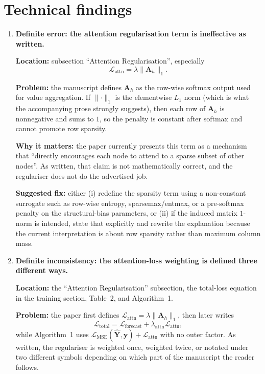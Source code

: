 \documentclass[11pt]{article}
\begin{document}
\section*{Technical findings}

\begin{enumerate}

\item \textbf{Definite error: the attention regularisation term is ineffective as written.}

\textbf{Location:} subsection ``Attention Regularisation'', especially
\[
\mathcal{L}_{\text{attn}} = \lambda \lVert \mathbf{A}_h \rVert_1.
\]

\textbf{Problem:} the manuscript defines $\mathbf{A}_h$ as the row-wise softmax output used for value aggregation. If $\lVert \cdot \rVert_1$ is the elementwise $L_1$ norm (which is what the accompanying prose strongly suggests), then each row of $\mathbf{A}_h$ is nonnegative and sums to $1$, so the penalty is constant after softmax and cannot promote row sparsity.

\textbf{Why it matters:} the paper currently presents this term as a mechanism that ``directly encourages each node to attend to a sparse subset of other nodes''. As written, that claim is not mathematically correct, and the regulariser does not do the advertised job.

\textbf{Suggested fix:} either (i) redefine the sparsity term using a non-constant surrogate such as row-wise entropy, sparsemax/entmax, or a pre-softmax penalty on the structural-bias parameters, or (ii) if the induced matrix $1$-norm is intended, state that explicitly and rewrite the explanation because the current interpretation is about row sparsity rather than maximum column mass.

\item \textbf{Definite inconsistency: the attention-loss weighting is defined three different ways.}

\textbf{Location:} the ``Attention Regularisation'' subsection, the total-loss equation in the training section, Table~2, and Algorithm~1.

\textbf{Problem:} the paper first defines $\mathcal{L}_{\text{attn}} = \lambda \lVert \mathbf{A}_h \rVert_1$, then later writes
\[
\mathcal{L}_{\text{total}} = \mathcal{L}_{\text{forecast}} + \lambda_{\text{attn}}\mathcal{L}_{\text{attn}},
\]
while Algorithm~1 uses $\mathcal{L}_{\text{MSE}}(\hat{\mathbf{Y}}, \mathbf{y}) + \mathcal{L}_{\text{attn}}$ with no outer factor. As written, the regulariser is weighted once, weighted twice, or notated under two different symbols depending on which part of the manuscript the reader follows.


\end{enumerate}
\end{document}
